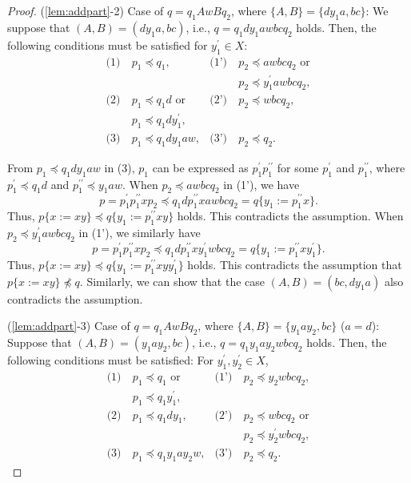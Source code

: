 \begin{proof}
\smallskip

\noindent
(\ref{lem:addpart}-2) Case of $q=q_{1}AwBq_{2}$, where $\{ A,B \} = \{ dy_{1}a,bc \}$:
We suppose that $(A, B) = (dy_{1}a, bc)$, i.e., $q = q_{1}dy_{1}awbcq_{2} $ holds.
  Then, the following conditions must be satisfied for $y_{1}^{\prime}\in X$:
  \begin{align*}
    \textrm{(1)}~& p_{1} \preceq q_{1}, & \textrm{(1')}~& p_{2} \preceq awbcq_{2}\mbox{ or} \\
    & & & p_{2} \preceq y_{1}^{\prime}awbcq_{2},\\
    \textrm{(2)}~& p_{1} \preceq q_{1}d\mbox{ or}  & \textrm{(2')}~& p_{2} \preceq wbcq_{2}, \\
    & p_{1} \preceq q_{1}dy_{1}^{\prime}, & & \\
    \textrm{(3)}~& p_{1} \preceq q_{1}dy_{1}aw, & \textrm{(3')}~& p_{2} \preceq q_{2}.
  \end{align*}
  
  From $p_{1} \preceq q_{1}dy_{1}aw$ in (3), $p_{1}$ can be expressed as $p^{\prime}_{1}p^{\prime\prime}_{1}$ for some $p^{\prime}_{1}$ and $p^{\prime\prime}_{1}$, where $p^{\prime}_{1} \preceq q_{1}d$ and $p^{\prime\prime}_{1} \preceq y_{1}aw$.
  When $p_{2} \preceq awbcq_{2}$ in (1'), we have
  $$p=p^{\prime}_{1}p^{\prime\prime}_{1}xp_{2} \preceq q_{1}dp^{\prime\prime}_{1}xawbcq_{2}=q \{ y_{1}:=p^{\prime\prime}_{1}x \}.$$
  Thus, $p \{ x := xy \} \preceq q \{ y_{1}:=p^{\prime\prime}_{1}xy \}$ holds.
  This contradicts the assumption.
  When $p_{2} \preceq y_{1}^{\prime}awbcq_{2}$ in (1'), we similarly have
  $$p=p^{\prime}_{1}p^{\prime\prime}_{1}xp_{2} \preceq q_{1}dp^{\prime\prime}_{1}xy_{1}^{\prime}wbcq_{2}=q \{ y_{1}:=p^{\prime\prime}_{1}xy_{1}^{\prime} \}.$$
  Thus, $p \{ x := xy \} \preceq q \{ y_{1}:=p^{\prime\prime}_{1}xyy_{1}^{\prime} \}$ holds.
  This contradicts the assumption that $p \{ x := xy \} \not\preceq q$.
  Similarly, we can show that the case $(A, B) = (bc, dy_{1}a)$ also contradicts the assumption.
  
  \smallskip

  \noindent
  (\ref{lem:addpart}-3) Case of $q=q_{1}AwBq_{2}$, where $\{ A,B \} = \{ y_{1}ay_{2},bc \}$ ($a = d$):
  Suppose that $(A, B) = (y_{1}ay_{2}, bc)$, i.e., $q = q_{1}y_{1}ay_{2}wbcq_{2} $ holds.
  Then, the following conditions must be satisfied: For $y_{1}^{\prime}, y_{2}^{\prime} \in X$,
  \begin{align*}
    \textrm{(1)}~& p_{1} \preceq q_{1}\mbox{ or} & \textrm{(1')}~& p_{2} \preceq y_{2}wbcq_{2}, \\
    & p_{1} \preceq q_{1}y_{1}^{\prime}, & & \\
    \textrm{(2)}~& p_{1} \preceq q_{1}dy_{1}, & \textrm{(2')}~& p_{2} \preceq wbcq_{2}\mbox{ or}\\    
    & & & p_{2} \preceq y_{2}^{\prime}wbcq_{2}, \\
    \textrm{(3)}~& p_{1} \preceq q_{1}y_{1}ay_{2}w, & \textrm{(3')}~& p_{2} \preceq q_{2}.
  \end{align*}
  

\end{proof}
